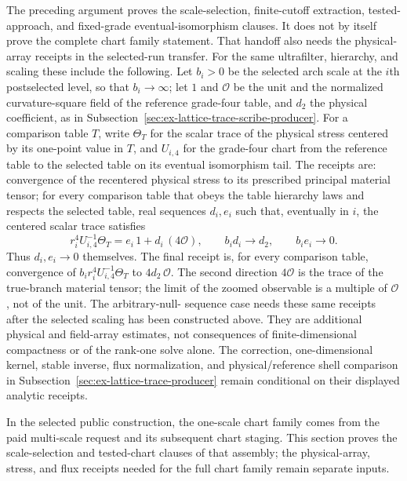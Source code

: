 The preceding argument proves the scale-selection, finite-cutoff extraction,
tested-approach, and fixed-grade eventual-isomorphism clauses. It does not
by itself prove the complete chart family statement. That handoff also needs the
physical-array receipts in the selected-run transfer. For the same
ultrafilter, hierarchy, and scaling these include the following. Let
$b_i>0$ be the selected arch scale at the $i$th postselected level, so
that $b_i\to\infty$; let $1$ and $\mathcal O$ be the unit and the
normalized curvature-square field of the reference grade-four table, and
$d_2$ the physical coefficient, as in
Subsection~\ref{sec:ex-lattice-trace-scribe-producer}. For a comparison table
$T$, write $\Theta_T$ for the scalar trace of the physical stress centered
by its one-point value in $T$, and $U_{i,4}$ for the grade-four chart from
the reference table to the selected table on its eventual isomorphism
tail. The receipts are:
convergence of the recentered physical stress to its prescribed principal
material tensor; for every comparison table that obeys the table hierarchy
laws and respects the selected table, real sequences $d_i,e_i$ such that,
eventually in $i$, the centered scalar trace satisfies
\[
 r_i^4U_{i,4}^{-1}\Theta_T=e_i\,1+d_i\,(4\mathcal O),
 \qquad b_id_i\longrightarrow d_2,\qquad b_ie_i\longrightarrow0.
\]
Thus $d_i,e_i\to0$ themselves. The final receipt is, for every comparison
table, convergence of $b_ir_i^4U_{i,4}^{-1}\Theta_T$ to
$4d_2\,\mathcal O$. The second direction
$4\mathcal O$ is the trace of the true-branch material tensor; the limit
of the zoomed observable is a multiple of $\mathcal O$, not of the unit. The arbitrary-null-
sequence case needs these same receipts after the selected scaling has
been constructed above. They are additional physical and field-array
estimates, not consequences of finite-dimensional compactness or of the
rank-one solve alone. The correction, one-dimensional
kernel, stable inverse, flux normalization, and physical/reference shell
comparison in Subsection~\ref{sec:ex-lattice-trace-producer} remain conditional
on their displayed analytic receipts.

In the selected public construction, the one-scale chart family comes from
the paid multi-scale request and its subsequent chart staging. This section
proves the scale-selection and tested-chart clauses of that assembly; the
physical-array, stress, and flux receipts needed for the full chart family remain
separate inputs.
